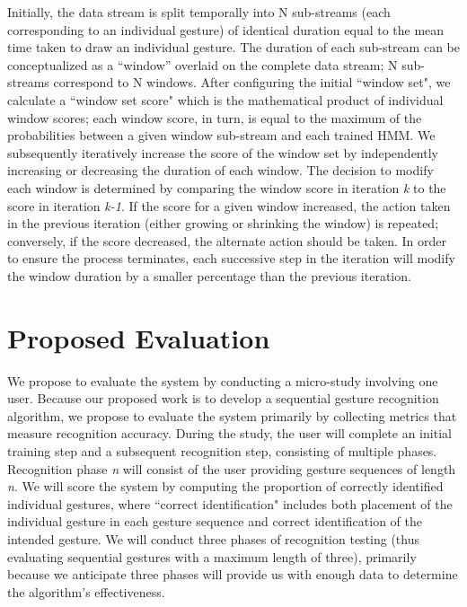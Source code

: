 \documentclass[twoside]{article}
\begin{document}
\begin{multicols}{2}
Initially, the data stream is split temporally into N sub-streams 
(each corresponding to an individual gesture) of identical duration equal to the 
mean time taken to draw an individual gesture.
The duration of each sub-stream can be conceptualized as a ``window'' overlaid
on the complete data stream; N sub-streams correspond to N windows. After
configuring the initial ``window set", we calculate a ``window set score" which is %
the mathematical product of individual window scores; each window score, in turn, 
is equal to the maximum of the probabilities between a given window sub-stream 
and each trained HMM. We subsequently iteratively increase the score of the window set %
by independently increasing or decreasing the duration of each window. The decision to modify each window is determined by 
comparing the window score in iteration \emph{k} to the score in iteration \emph{k-1}. 
If the score for a given window increased, the action taken in the previous iteration (either
growing or shrinking the window) is repeated; conversely, if the score
decreased, the alternate action should be taken. In order to ensure the process terminates, each successive step in the iteration will modify the
window duration by a smaller percentage than the previous iteration.%
\section{Proposed Evaluation}

We propose to evaluate the system by conducting a micro-study involving one
user. Because our proposed work is to develop a sequential gesture recognition
algorithm, we propose to evaluate the system primarily by collecting metrics
that measure recognition accuracy. During the study, the user will complete an
initial training step and a subsequent recognition step, consisting of multiple
phases.
Recognition phase \emph{n} will consist of the user providing gesture sequences
of length \emph{n}. We will score the system by computing the proportion of
correctly identified individual gestures, where ``correct identification"
includes both placement of the individual gesture in
each gesture sequence and correct identification of the intended gesture. %
We will conduct three phases of recognition testing (thus evaluating sequential gestures with a maximum length of three), 
primarily because we anticipate three phases will provide us with enough data to determine the algorithm's effectiveness.


\end{multicols}
\end{document}
